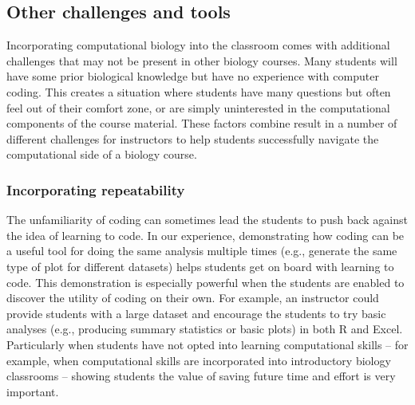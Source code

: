 

\subsection{Other challenges and tools}

Incorporating computational biology into the classroom comes with additional challenges that may not be present in other biology courses.
Many students will have some prior biological knowledge but have no experience with computer coding.
This creates a situation where students have many questions but often feel out of their comfort zone, or are simply uninterested in the computational components of the course material.
These factors combine result in a number of different challenges for instructors to help students successfully navigate the computational side of a biology course.

\subsubsection{Incorporating repeatability}
The unfamiliarity of coding can sometimes lead the students to push back against the idea of learning to code.
In our experience, demonstrating how coding can be a useful tool for doing the same analysis multiple times (e.g., generate the same type of plot for different datasets) helps students get on board with learning to code. 
This demonstration is especially powerful when the students are enabled to discover the utility of coding on their own. 
For example, an instructor could provide students with a large dataset and encourage the students to try basic analyses (e.g., producing summary statistics or basic plots) in both R and Excel. 
Particularly when students have not opted into learning computational skills -- for example, when computational skills are incorporated into introductory biology classrooms -- showing students the value of saving future time and effort is very important. 


